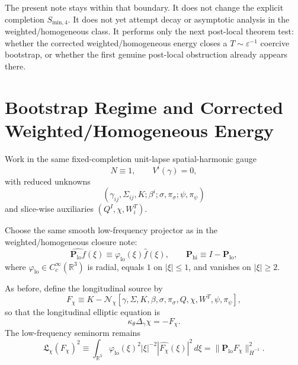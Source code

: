 \documentclass[11pt]{article}
\begin{document}
The present note stays within that boundary. It does not change the explicit completion \(S_{\mathrm{min},4}\). It does not yet attempt decay or asymptotic analysis in the weighted/homogeneous class. It performs only the next post-local theorem test: whether the corrected weighted/homogeneous energy closes a \(T\sim \varepsilon^{-1}\) coercive bootstrap, or whether the first genuine post-local obstruction already appears there.

\section{Bootstrap Regime and Corrected Weighted/Homogeneous Energy}

Work in the same fixed-completion unit-lapse spatial-harmonic gauge
\begin{equation}
N\equiv 1,
\qquad
V^i(\gamma)=0,
\label{eq:gauge}
\end{equation}
with reduced unknowns
\begin{equation}
(\gamma_{ij},\Sigma_{ij},K;\beta^i;\sigma,\pi_\sigma;\psi,\pi_\psi)
\label{eq:unknowns}
\end{equation}
and slice-wise auxiliaries \((Q^I,\chi,W_i^T)\).

Choose the same smooth low-frequency projector as in the weighted/homogeneous closure note:
\begin{equation}
\widehat{\mathbf P_{\mathrm{lo}}f}(\xi)
\equiv
\varphi_{\mathrm{lo}}(\xi)\widehat f(\xi),
\qquad
\mathbf P_{\mathrm{hi}}\equiv I-\mathbf P_{\mathrm{lo}},
\label{eq:projector}
\end{equation}
where \(\varphi_{\mathrm{lo}}\in C_c^\infty(\mathbb R^3)\) is radial, equals \(1\) on \(|\xi|\le 1\), and vanishes on \(|\xi|\ge 2\).

As before, define the longitudinal source by
\begin{equation}
F_\chi
\equiv
K-\mathcal N_\chi[\gamma,\Sigma,K,\beta,\sigma,\pi_\sigma,Q,\chi,W^T,\psi,\pi_\psi],
\label{eq:Fchi}
\end{equation}
so that the longitudinal elliptic equation is
\begin{equation}
\kappa_\theta \Delta_\gamma \chi = -F_\chi.
\label{eq:chieq}
\end{equation}
The low-frequency seminorm remains
\begin{equation}
\mathfrak L_\chi(F_\chi)^2
\equiv
\int_{\mathbb R^3}
\varphi_{\mathrm{lo}}(\xi)^2 |\xi|^{-2}
|\widehat{F_\chi}(\xi)|^2\,d\xi
=
\|\mathbf P_{\mathrm{lo}}F_\chi\|_{\dot H^{-1}}^2.
\label{eq:Lchi}
\end{equation}
\end{document}
